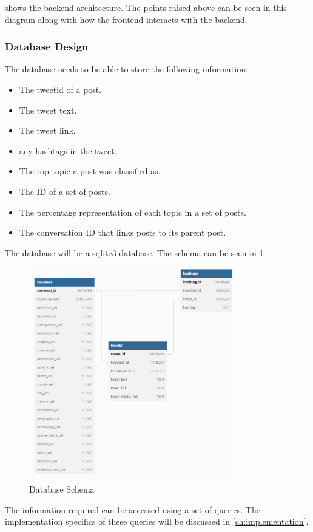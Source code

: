 shows the backend architecture. The points raised above can be seen in this diagram along with how the frontend
interacts with the backend.
\subsubsection{Database Design}
The database needs to be able to store the following information:
\begin{itemize}
    \item The tweetid of a post.
    \item The tweet text.
    \item The tweet link.
    \item any hashtags in the tweet.
    \item The top topic a post was classified as.
    \item The ID of a set of posts.
    \item The percentage representation of each topic in a set of posts.
    \item The conversation ID that links posts to its parent post.
\end{itemize}
The database will be a sqlite3 database. The schema can be seen in \cref{fig:database}
\begin{figure}[hbtp]
    \centering
    \includegraphics[width=0.8\textwidth]{../images/database.png}
    \caption{Database Schema}
    \label{fig:database}
\end{figure}
The information required can be accessed using a set of queries. The implementation specifics of these queries will be discussed in \cref{ch:implementation}.